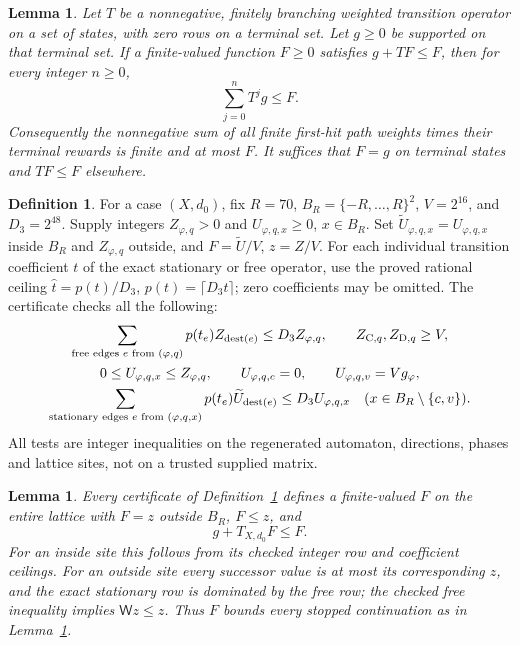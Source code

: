 \documentclass[11pt,reqno]{amsart}
\newtheorem{lemma}[theorem]{Lemma}
\theoremstyle{definition}
\newtheorem{definition}[theorem]{Definition}
\theoremstyle{remark}
\begin{document}
\begin{lemma}\label{l:Bellman-soundness}
Let \(T\) be a nonnegative, finitely branching weighted transition
operator on a set of states, with zero rows on a terminal set.
Let \(g\ge0\) be supported on that terminal set.
If a finite-valued function \(F\ge0\) satisfies
\(g+TF\le F\), then for every integer \(n\ge0\),
\[
 \sum_{j=0}^{n}T^jg\le F .
\]
Consequently the nonnegative sum of all finite first-hit path
weights times their terminal rewards is finite and at most \(F\).
It suffices that \(F=g\) on terminal states and \(TF\le F\)
elsewhere.
\end{lemma}

\begin{definition}\label{d:stationary-certificate}
For a case \((X,d_0)\), fix \(R=70\),
\(B_R=\{-R,\ldots,R\}^2\), \(V=2^{16}\), and \(D_3=2^{48}\).
Supply integers \(Z_{\varphi,q}>0\) and
\(U_{\varphi,q,x}\ge0\), \(x\in B_R\).
Set \(\widetilde U_{\varphi,q,x}=U_{\varphi,q,x}\) inside \(B_R\)
and \(Z_{\varphi,q}\) outside, and \(F=\widetilde U/V\), \(z=Z/V\).
For each individual transition coefficient \(t\) of the exact
stationary or free operator, use the proved rational ceiling
\(\widehat t=p(t)/D_3\), \(p(t)=\lceil D_3t\rceil\);
zero coefficients may be omitted.
The certificate checks all the following:
\[
 \begin{gathered}
 \sum_{\text{free edges }e\text{ from }(\varphi,q)}
       p(t_e)Z_{\operatorname{dest}(e)}
       \le D_3Z_{\varphi,q},\qquad Z_{{\rm C},q},Z_{{\rm D},q}\ge V,\\
 0\le U_{\varphi,q,x}\le Z_{\varphi,q},\qquad
 U_{\varphi,q,c}=0,\qquad U_{\varphi,q,v}=Vg_\varphi,\\
 \sum_{\text{stationary edges }e\text{ from }(\varphi,q,x)}
       p(t_e)\widetilde U_{\operatorname{dest}(e)}
       \le D_3 U_{\varphi,q,x}
       \quad(x\in B_R\setminus\{c,v\}).
 \end{gathered}
\]
All tests are integer inequalities on the regenerated automaton,
directions, phases and lattice sites, not on a trusted supplied matrix.
\end{definition}

\begin{lemma}\label{l:stationary-local-global}
Every certificate of Definition~\ref{d:stationary-certificate}
defines a finite-valued \(F\) on the entire lattice with
\(F=z\) outside \(B_R\), \(F\le z\), and
\[
 g+T_{X,d_0}F\le F .
\]
For an inside site this follows from its checked integer row and
coefficient ceilings. For an outside site every successor value
is at most its corresponding \(z\), and the exact stationary row
is dominated by the free row; the checked free inequality
implies \(\mathsf Wz\le z\).
Thus \(F\) bounds every stopped continuation as in
Lemma~\ref{l:Bellman-soundness}.
\end{lemma}
\end{document}
